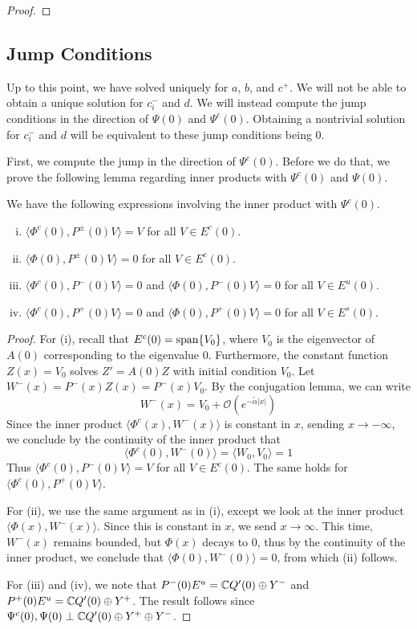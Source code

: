 \documentclass[thesis.tex]{subfiles}
\begin{document}
\begin{lemma}
\begin{proof}
\end{proof}
\end{lemma}

\subsection{Jump Conditions}
Up to this point, we have solved uniquely for $a$, $b$, and $c^+$. We will not be able to obtain a unique solution for $c_i^-$ and $d$. We will instead compute the jump conditions in the direction of $\Psi(0)$ and $\Psi^c(0)$. Obtaining a nontrivial solution for $c_i^-$ and $d$ will be equivalent to these jump conditions being 0.

First, we compute the jump in the direction of $\Psi^c(0)$. Before we do that, we prove the following lemma regarding inner products with $\Psi^c(0)$ and $\Psi(0)$.

\begin{lemma}\label{PsiIP}
We have the following expressions involving the inner product with $\Psi^c(0)$.
\begin{enumerate}[(i)]
	\item $\langle \Phi^c(0), P^\pm(0) V \rangle = V$ for all $V \in E^c(0)$.
	\item $\langle \Phi(0), P^\pm(0) V \rangle = 0$ for all $V \in E^c(0)$.
	\item $\langle \Phi^c(0), P^-(0) V \rangle = 0$ and $\langle \Phi(0), P^-(0) V \rangle = 0$ for all $V \in E^u(0)$.
	\item $\langle \Phi^c(0), P^+(0) V \rangle = 0$ and $\langle \Phi(0), P^+(0) V \rangle = 0$ for all $V \in E^s(0)$.
\end{enumerate}
\begin{proof}
For (i), recall that $E^c(0) = \mathop\mathrm{span}\nolimits\{ V_0 \}$, where $V_0$ is the eigenvector of $A(0)$ corresponding to the eigenvalue 0. Furthermore, the constant function $Z(x) = V_0$ solves $Z' = A(0) Z$ with initial condition $V_0$. Let $W^-(x) = P^-(x) Z(x) = P^-(x) V_0$. By the conjugation lemma, we can write
\[
W^-(x) = V_0 + \mathcal{O}({e^{-\tilde{\alpha}|x|}})
\]
Since the inner product $\langle \Phi^c(x), W^-(x) \rangle$ is constant in $x$, sending $x \rightarrow -\infty$, we conclude by the continuity of the inner product that
\[
\langle \Phi^c(0), W^-(0) \rangle = \langle W_0, V_0 \rangle = 1 
\]
Thus $\langle \Phi^c(0), P^-(0) V \rangle = V$ for all $V \in E^c(0)$. The same holds for $\langle \Phi^c(0), P^+(0) V \rangle$.

For (ii), we use the same argument as in (i), except we look at the inner product $\langle \Phi(x), W^-(x) \rangle$. Since this is constant in $x$, we send $x \rightarrow \infty$. This time, $W^-(x)$ remains bounded, but $\Phi(x)$ decays to 0, thus by the continuity of the inner product, we conclude that $\langle \Phi(0), W^-(0) \rangle = 0$, from which (ii) follows.

For (iii) and (iv), we note that $P^-(0)E^u = \mathbb{C} Q'(0) \oplus Y^-$ and $P^+(0)E^u = \mathbb{C} Q'(0) \oplus Y^+$. The result follows since $\Psi^c(0), \Psi(0) \perp \mathbb{C} Q'(0) \oplus Y^+ \oplus Y^-$.
\end{proof}
\end{lemma}
\end{document}

